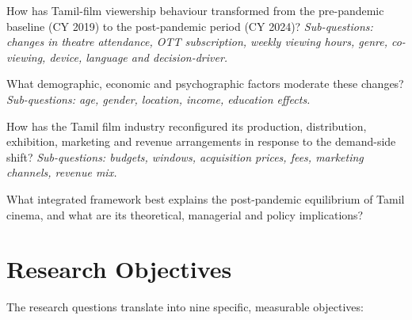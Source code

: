\begin{description}[style=nextline,leftmargin=2.4em]
\item[RQ1.] How has Tamil-film viewership behaviour transformed
            from the pre-pandemic baseline (CY 2019) to the
            post-pandemic period (CY 2024)?
            \textit{Sub-questions: changes in theatre attendance,
            OTT subscription, weekly viewing hours, genre, co-viewing,
            device, language and decision-driver.}
\item[RQ2.] What demographic, economic and psychographic factors
            moderate these changes?
            \textit{Sub-questions: age, gender, location, income,
            education effects.}
\item[RQ3.] How has the Tamil film industry reconfigured its
            production, distribution, exhibition, marketing and
            revenue arrangements in response to the demand-side
            shift?
            \textit{Sub-questions: budgets, windows, acquisition
            prices, fees, marketing channels, revenue mix.}
\item[RQ4.] What integrated framework best explains the
            post-pandemic equilibrium of Tamil cinema, and what
            are its theoretical, managerial and policy
            implications?
\end{description}

\section{Research Objectives}
\label{sec:objectives}

The research questions translate into nine specific, measurable
objectives:

